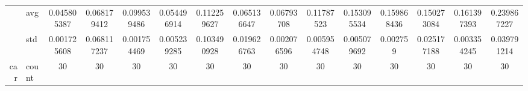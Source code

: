 \begin{table}[H]
{\begin{tabular}{rlccc|c|c|c|c|c|ccccc}
			                                                                               & avg                & \cellcolor[rgb]{ .388,  .745,  .482}\textcolor[rgb]{ 0,  .38,  0}{0.045805387} & \cellcolor[rgb]{ .592,  .804,  .494}0.068179412                                & \cellcolor[rgb]{ .882,  .886,  .51}0.099539486                                 & \cellcolor[rgb]{ .467,  .765,  .486}0.054496914 & \cellcolor[rgb]{ 1,  .922,  .518}0.112259627                                   & \cellcolor[rgb]{ .565,  .796,  .49}0.065136647  & \cellcolor[rgb]{ .588,  .8,  .49}0.06793708                                    & \cellcolor[rgb]{ 1,  .902,  .514}0.11787523     & \cellcolor[rgb]{ .992,  .761,  .486}0.153095534 & \cellcolor[rgb]{ .992,  .733,  .482}0.159868436 & \cellcolor[rgb]{ .992,  .773,  .49}0.150273084  & \cellcolor[rgb]{ .992,  .725,  .482}0.161397393 & \cellcolor[rgb]{ .973,  .412,  .42}0.239867227  \\
			                                                                               & std                & 0.001725608                                                                    & 0.068117237                                                                    & 0.001754469                                                                    & 0.005239285                                     & 0.103490928                                                                    & 0.019626763                                     & 0.002076596                                                                    & 0.005954748                                     & 0.005079692                                     & 0.002759                                        & 0.025177188                                     & 0.003354245                                     & 0.039791214                                     \\
			car                                                                            & count              & 30                                                                             & 30                                                                             & 30                                                                             & 30                                              & 30                                                                             & 30                                              & 30                                                                             & 30                                              & 30                                              & 30                                              & 30                                              & 30                                              & 30                                              \\

\end{tabular}}
\end{table}
